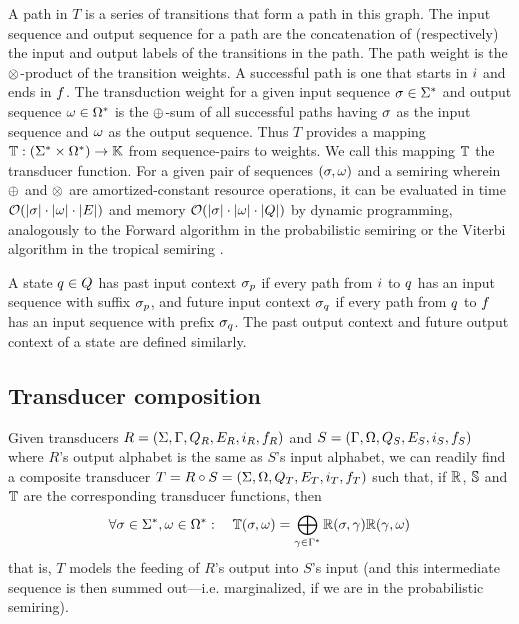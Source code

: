 \documentclass[english]{article}
\begin{document}
A path in $T$ is a series of transitions that form a path in this graph.
The input sequence and output sequence for a path are the concatenation of (respectively)
the input and output labels of the transitions in the path.
The path weight is the $\otimes$-product of the transition weights.
A successful path is one that starts in $i$ and ends in $f$.
The transduction weight for a given input sequence $\sigma \in {\Sigma}^{\ast}$
and output sequence $\omega \in {\Omega}^{\ast}$
is the $\oplus$-sum of all successful paths
having $\sigma$ as the input sequence
and $\omega$ as the output sequence.
Thus $T$ provides a mapping
$\mathbb{T}:({\Sigma}^{\ast} \times {\Omega}^{\ast}) \to \mathbb{K}$
from sequence-pairs to weights.
We call this mapping $\mathbb{T}$ the transducer function.
For a given pair of sequences $(\sigma,\omega)$
and a semiring wherein $\oplus$ and $\otimes$ are amortized-constant resource operations,
it can be evaluated in time ${\cal O}(|\sigma| \cdot |\omega| \cdot |E|)$
and memory ${\cal O}(|\sigma| \cdot |\omega| \cdot |Q|)$
by dynamic programming,
analogously to the Forward algorithm in the probabilistic semiring
or the Viterbi algorithm in the tropical semiring
\cite{Durbin98}.

A state $q \in Q$ has past input context $\sigma_p$ if every path from $i$ to $q$ has an input sequence with suffix $\sigma_p$,
and future input context $\sigma_q$ if every path from $q$ to $f$ has an input sequence with prefix $\sigma_q$.
The past output context and future output context of a state are defined similarly.

\subsection{Transducer composition}

Given transducers
 $R = (\Sigma, \Gamma, Q_R, E_R, i_R, f_R)$ and
 $S = (\Gamma, \Omega, Q_S, E_S, i_S, f_S)$
where $R$'s output alphabet is the same as $S$'s input alphabet,
we can readily find a composite transducer
 $T = R \circ S = (\Sigma, \Omega, Q_T, E_T, i_T, f_T)$
such that, if $\mathbb{R}$, $\mathbb{S}$ and $\mathbb{T}$ are the corresponding transducer functions,
then
\[
\forall \sigma \in {\Sigma}^{\ast}, \omega \in {\Omega}^{\ast}:
\quad
\mathbb{T}(\sigma,\omega) = \bigoplus_{\gamma \in {\Gamma}^{\ast}} \mathbb{R}(\sigma,\gamma) \mathbb{R}(\gamma,\omega)
\]
that is, $T$ models the feeding of $R$'s output into $S$'s input
(and this intermediate sequence is then summed out---i.e. marginalized, if we are in the probabilistic semiring).
\end{document}
